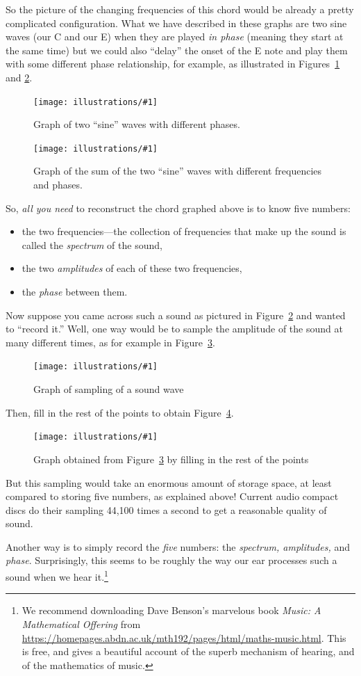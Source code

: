 \documentclass[openany]{book}
\newcommand{\ill}[3]{%
   \begin{figure}[H]%
   \vspace{-2ex}
   \centering%
   \texttt{[image: illustrations/\#1]}%
   \caption{#3}%
   \vspace{-2ex}
    \end{figure}}
\theoremstyle{plain}
\theoremstyle{definition}
\begin{document}
{So the picture of the changing frequencies of this chord would be
already a pretty complicated configuration.  What we have described in
these graphs are two sine waves (our C and our E) when they are played
{\em in phase} (meaning they start at the same time) but we could
also ``delay'' the onset of the E note and play them with some
different phase relationship, for example, as illustrated
in Figures~\ref{fig:sin-twofreq-phase} and \ref{fig:sum-sin-phase}.

\ill{sin-twofreq-phase}{.6}{\label{fig:sin-twofreq-phase}Graph of two ``sine'' waves with different phases.}

\ill{sin-twofreq-phase-sum}{.6}{Graph of the sum of the two ``sine'' waves with different frequencies
and phases.\label{fig:sum-sin-phase}}


  So, {\em all you need} to reconstruct the chord graphed above is to
  know five numbers:
  \begin{itemize}
  \item the two frequencies---the collection of frequencies that make
    up the sound is called the {\em spectrum} of the sound,
  \item the two {\em amplitudes} of each of these two frequencies,
  \item the {\em phase} between them.

 \end{itemize}

 Now suppose you came across such a sound as pictured in
 Figure~\ref{fig:sum-sin-phase} and wanted to ``record it.''  Well,
 one way would be to sample the amplitude of the sound at many
 different times, as for example in Figure~\ref{fig:sum-sin-phase-sample}.

\ill{sin-twofreq-phase-sum-points}{.6}{Graph of sampling of a sound wave\label{fig:sum-sin-phase-sample}}

Then, fill in the rest of the points to obtain Figure~\ref{fig:sum-sin-phase-sample-fill}.

\ill{sin-twofreq-phase-sum-fill}{0.6}{Graph obtained from Figure~\ref{fig:sum-sin-phase-sample} by
filling in the rest of the points\label{fig:sum-sin-phase-sample-fill}}

But this sampling would take an enormous amount of storage space, at
least compared to storing five numbers, as explained above!
Current audio compact discs do their sampling 44,100 times a second to
get a reasonable quality of sound.

Another way is to simply record the {\em five} numbers: the {\em
  spectrum, amplitudes,} and {\em phase}.  Surprisingly, this seems to
be roughly the way our ear processes such a sound when we hear it.\footnote{%
We recommend downloading Dave Benson's marvelous book
{\em Music: A Mathematical Offering} from
\url{https://homepages.abdn.ac.uk/mth192/pages/html/maths-music.html}.
This is free, and gives a beautiful account of the superb
mechanism of hearing, and of the mathematics of music.}

}
\end{document}
